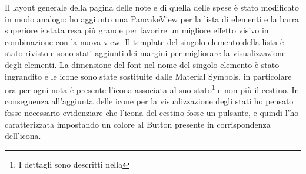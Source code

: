 Il layout generale della pagina delle note e di quella delle spese è stato modificato in modo analogo: ho aggiunto una PancakeView per la lista di elementi e la barra superiore è stata resa più grande per favorire un migliore effetto visivo in combinazione con la nuova view. Il template del singolo elemento della lista è stato rivisto e sono stati aggiunti dei margini per migliorare la visualizzazione degli elementi. La dimensione del font nel nome del singolo elemento è stato ingrandito e le icone sono state sostituite dalle Material Symbols, in particolare ora per ogni nota è presente l'icona associata al suo stato\footnote{I dettagli sono descritti nella } e non più il cestino. In conseguenza all'aggiunta delle icone per la visualizzazione degli stati ho pensato fosse necessario evidenziare che l'icona del cestino fosse un pulsante, e quindi l'ho caratterizzata impostando un colore al Button presente in corrispondenza dell'icona.


